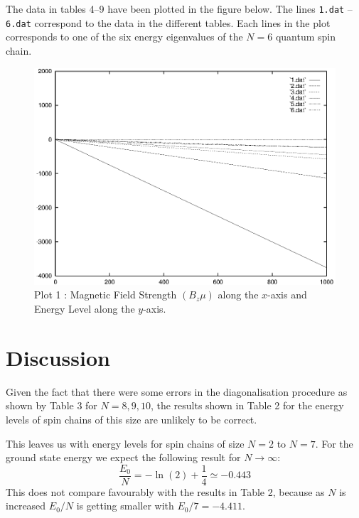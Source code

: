 \documentclass[a4paper]{IEEEtran}
\begin{document}
    The data in tables 4--9 have been plotted in the figure below. The lines
    \texttt{1.dat} -- \texttt{6.dat} correspond to the data in the different
    tables. Each lines in the plot corresponds to one of the six energy eigenvalues
    of the $N=6$ quantum spin chain.

    \begin{figure}[ht!]  
        \centering
        \caption{Plot 1 : Magnetic Field Strength $(B_z\mu)$ along the $x$-axis
             and Energy Level along the $y$-axis.}
        \label{fig:magnetic} 
        \includegraphics[width=\columnwidth]{magnetic.eps}
    \end{figure} 

\section{Discussion}

    Given the fact that there were some errors in the diagonalisation procedure
    as shown by Table 3 for $N=8,9,10$, the results shown in Table 2 for
    the energy levels of spin chains of this size are unlikely to 
    be correct. 

    This leaves us with energy levels for spin chains of size $N=2$ to
    $N=7$. For the ground state energy we expect the following result
    for $N \rightarrow \infty$:
        \[ \frac{E_0}{N} = -\ln(2) + \frac{1}{4} \simeq -0.443 \]
    This does not compare favourably with the results in Table 2, because
    as $N$ is increased $E_0/N$ is getting smaller with $E_0/7 = -4.411$.
\end{document}
